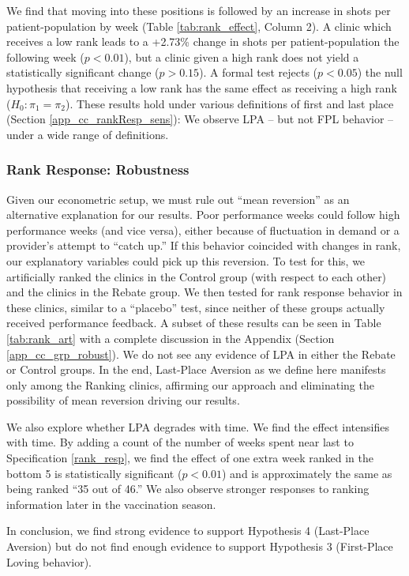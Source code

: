  We find that moving into these positions is followed by an increase in shots per patient-population by week (Table \ref{tab:rank_effect}, Column 2). A clinic which receives a low rank leads to a +2.73\% change in shots per patient-population the following week ($p < 0.01$), but a clinic given a high rank does not yield a statistically significant change ($p > 0.15$). A formal test rejects ($p < 0.05$) the null hypothesis that receiving a low rank has the same effect as receiving a high rank ($H_0: \pi_1 = \pi_2$). These results hold under various definitions of first and last place (Section \ref{app_cc_rankResp_sens}): We observe LPA – but not FPL behavior – under a wide range of definitions. 
 
 \subsubsection{Rank Response: Robustness} \label{rpf_robust}
 Given our econometric setup, we must rule out “mean reversion” as an alternative explanation for our results. Poor performance weeks could follow high performance weeks (and vice versa), either because of fluctuation in demand or a provider’s attempt to “catch up.” If this behavior coincided with changes in rank, our explanatory variables could pick up this reversion. To test for this, we artificially ranked the clinics in the Control group (with respect to each other) and the clinics in the Rebate group. We then tested for rank response behavior in these clinics, similar to a “placebo” test, since neither of these groups actually received performance feedback. A subset of these results can be seen in Table \ref{tab:rank_art} with a complete discussion in the Appendix (Section \ref{app_cc_grp_robust}). We do not see any evidence of LPA in either the Rebate or Control groups. In the end, Last-Place Aversion as we define here manifests only among the Ranking clinics, affirming our approach and eliminating the possibility of mean reversion driving our results.
 
 We also explore whether LPA degrades with time. We find the effect intensifies with time. By adding a count of the number of weeks spent near last to Specification \ref{rank_resp}, we find the effect of one extra week ranked in the bottom 5 is statistically significant ($p < 0.01$) and is approximately the same as being ranked “35 out of 46.” We also observe stronger responses to ranking information later in the vaccination season.
 
 In conclusion, we find strong evidence to support Hypothesis 4 (Last-Place Aversion) but do not find enough evidence to support Hypothesis 3 (First-Place Loving behavior). 
 

